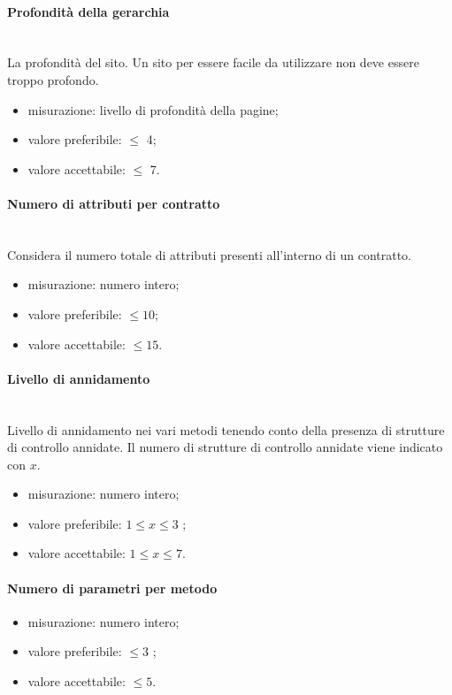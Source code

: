 			\paragraph*{Profondità della gerarchia} \mbox{}\\
			La profondità del sito. Un sito per essere facile da utilizzare non deve essere troppo profondo.
			\begin{itemize}
				\item misurazione: livello di profondità della pagine;
				\item valore preferibile: $\leq$ 4;
				\item valore accettabile: $\leq$ 7.
			\end{itemize}
		
			\paragraph*{Numero di attributi per contratto}
			\mbox{}\\
			Considera il numero totale di attributi presenti
			all'interno di un contratto.
			\begin{itemize}
				\item misurazione: numero intero;
				\item valore preferibile: $\leq 10$;
				\item valore accettabile: $\leq 15$.
			\end{itemize}
		
			\paragraph*{Livello di annidamento}
			\mbox{}\\
			Livello di annidamento nei vari metodi tenendo conto della
			presenza di strutture di controllo annidate. Il numero di strutture di controllo annidate viene indicato con $x$.
			\begin{itemize}
				\item misurazione: numero intero;
				\item valore preferibile: $ 1 \leq x \leq3$ ;
				\item valore accettabile: $1 \leq x\leq 7$.
			\end{itemize}
	
		
			\paragraph*{Numero di parametri per metodo}
			\begin{itemize}
				\item misurazione: numero intero;
				\item valore preferibile: $ \leq 3$ ;
				\item valore accettabile: $ \leq 5$.
			\end{itemize}
			
